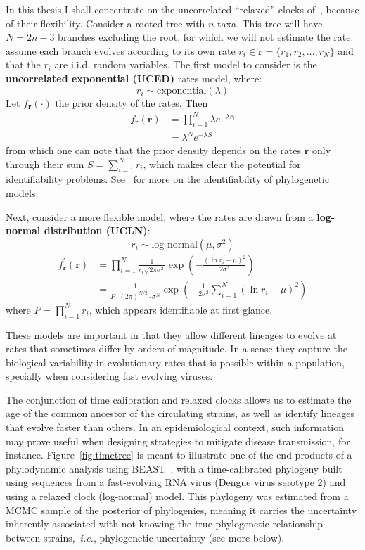 In this thesis I shall concentrate on the uncorrelated ``relaxed'' clocks of~\cite{Drummond2006}, because of their flexibility.
Consider a rooted tree with $n$ taxa. 
This tree will have $N = 2n-3$ branches excluding the root, for which we will not estimate the rate.
\cite{Drummond2006} assume each branch evolves according to its own rate $r_i \in \mathbf{r} =\{r_1, r_2, \ldots, r_{N}\}$ and that the $r_i$ are i.i.d. random variables.
The first model to consider is the \textbf{uncorrelated exponential (UCED)} rates model, where:
\[r_i \sim \text{exponential}(\lambda)\]
Let $f_{\mathbf{r}}(\cdot)$ the prior density of the rates.
Then
\begin{align}
 f_{\mathbf{r}}(\mathbf{r}) &= \prod_{i=1}^{N}\lambda e^{-\lambda r_i} \\
 &= \lambda^{N} e^{-\lambda S}
\end{align}
from which one can note that the prior density depends on the rates $\mathbf{r}$ only through their sum $S = \sum_{i=1}^{N} r_i$, which makes clear the potential for identifiability problems.
See~\cite{Rannala2002} for more on the identifiability of phylogenetic models.

Next, consider a more flexible model, where the rates are drawn from a \textbf{log-normal distribution (UCLN)}:
\[r_i \sim \text{log-normal}(\mu, \sigma^2)\]
\begin{align}
 f_{\mathbf{r}}^{\prime}(\mathbf{r}) &= \prod_{i=1}^{N} \frac{1}{r_i\sqrt{2\pi\sigma^2}} \exp\left(-\frac{(\ln r_i- \mu)^2}{2\sigma^2} \right) \\
 &= \frac{1}{P \cdot (2\pi)^{N/2} \cdot \sigma^{N}} \exp\left(-\frac{1}{2\sigma^2}\sum_{i=1}^{N}(\ln r_i- \mu)^2 \right)
 \end{align}
where $P = \prod_{i=1}^{N} r_i$, which appears identifiable at first glance.

These models are important in that they allow different lineages to evolve at rates that sometimes differ by orders of magnitude.
In a sense they capture the biological variability in evolutionary rates that is possible within a population, specially when considering fast evolving viruses.

The conjunction of time calibration and relaxed clocks allows us to estimate the age of the common ancestor of the circulating strains, as well as identify lineages that evolve faster than others.
In an epidemiological context, such information may prove useful when designing strategies to mitigate disease transmission, for instance.
Figure~\ref{fig:timetree} is meant to illustrate one of the end products of a phylodynamic analysis using BEAST~\citep{Drummond2007,Drummond2012}, with a time-calibrated phylogeny built using sequences from a fast-evolving RNA virus (Dengue virus serotype 2) and using a relaxed clock (log-normal) model.
This phylogeny was estimated from a MCMC sample of the posterior of phylogenies, meaning it carries the uncertainty inherently associated with not knowing the true phylogenetic relationship between strains,~\textit{i.e.}, phylogenetic uncertainty (see more below).

